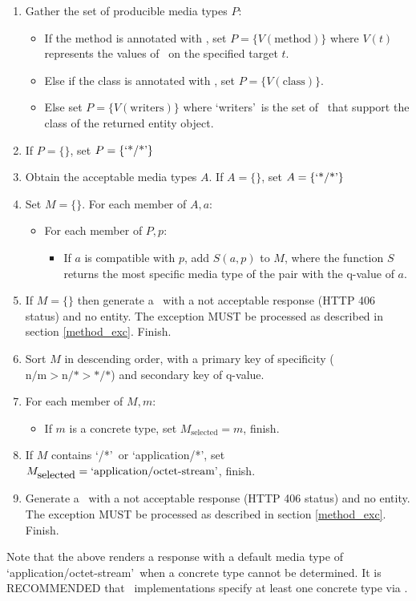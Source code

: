 \begin{enumerate}
\item Gather the set of producible media types $P$:
\begin{itemize}
\item If the method is annotated with \Produces, set $P = \{ V(\mbox{method}) \}$ where $V(t)$ represents the values of \Produces\ on the specified target $t$.
\item Else if the class is annotated with \Produces, set $P = \{ V(\mbox{class}) \}$.
\item Else set $P = \{ V(\mbox{writers}) \}$ where \lq writers\rq\ is the set of \MsgWrite\ that support the class of the returned entity object.
\end{itemize}

\item If $P = \{\}$, set $P = \{\mbox{\lq*/*\rq}\}$

\item Obtain the acceptable media types $A$. If $A = \{\}$, set $A = \{\mbox{\lq*/*\rq}\}$

\item Set $M=\{\}$. For each member of $A, a$:
\begin{itemize}
\item For each member of $P, p$:
\begin{itemize}
\item If $a$ is compatible with $p$, add $S(a,p)$ to $M$, where the function $S$ returns the most specific media type of the pair with the q-value of $a$.
\end{itemize}
\end{itemize}

\item If $M = \{\}$ then generate a \WebAppExc\ with a not acceptable response (HTTP 406 status) and no entity. The exception MUST be processed as described in section \ref{method_exc}. Finish.

\item Sort $M$ in descending order, with a primary key of specificity ($\mbox{n/m} > \mbox{n/*} > \mbox{*/*}$)  and secondary key of q-value.

\item For each member of $M, m$:
\begin{itemize}
\item If $m$ is a concrete type, set $M_{\mbox{selected}} = m$, finish.
\end{itemize}

\item If $M$ contains \lq*/*\rq\ or \lq application/*\rq, set $M_{\mbox{selected}} = \mbox{\lq application/octet-stream\rq}$, finish.

\item Generate a \WebAppExc\ with a not acceptable response (HTTP 406 status) and no entity. The exception MUST be processed as described in section \ref{method_exc}. Finish.
\end{enumerate}

Note that the above renders a response with a default media type of \lq application/octet-stream\rq\ when a concrete type cannot be determined. It is RECOMMENDED that \MsgWrite\ implementations specify at least one concrete type via \Produces.
